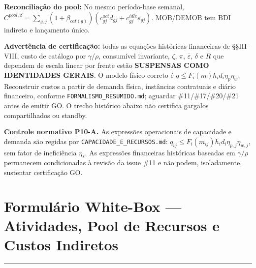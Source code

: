 \documentclass[
  10pt,
]{article}
\author{}
\date{}
\begin{document}
\noindent\textbf{Reconciliação do pool:}
No mesmo período-base semanal,
\(C^{pool,\beta}=\sum_{g,j}(1+\beta_{cat(g)})
(c_{gj}^{act}d_{gj}+c_{gj}^{idle}s_{gj})\).
MOB/DEMOB tem BDI indireto e lançamento único.

\noindent\textbf{Advertência de certificação:} todas as equações
históricas financeiras de §§III--VIII, custo de catálogo por
\(\gamma/\rho\), consumível invariante, \(\zeta\), \(\pi\),
\(\bar\varepsilon\), \(\delta\) e \(R\) que dependem de escala
linear por frente estão \textbf{SUSPENSAS COMO IDENTIDADES GERAIS}.
O modelo físico correto é \(q\le F_i(m)h_id_i\eta_p\eta_w\).
Reconstruir custos a partir de demanda física, instâncias
contratuais e diário financeiro, conforme
\texttt{FORMALISMO\_RESUMIDO.md}; aguardar \#11/\#17/\#20/\#21
antes de emitir GO. O trecho histórico abaixo não
certifica gargalos compartilhados ou standby.

\noindent\textbf{Controle normativo P10-A.}
As expressões operacionais de capacidade e demanda são regidas por
\texttt{CAPACIDADE\_E\_RECURSOS.md}: \(q_{ij}\le
F_i(m_{ij})h_id_i\eta_{p,j}\eta_{w,j}\), sem fator de ineficiência
\(\eta_s\). As expressões financeiras históricas baseadas em
\(\gamma/\rho\) permanecem condicionadas à revisão da issue \#11
e não podem, isoladamente, sustentar certificação GO.






{
\hypersetup{linkcolor=}
\setcounter{tocdepth}{4}
\tableofcontents
}
\hypertarget{formuluxe1rio-white-box-atividades-pool-de-recursos-e-custos-indiretos}{%
\section{Formulário White-Box --- Atividades, Pool de Recursos e Custos
Indiretos}\label{formuluxe1rio-white-box-atividades-pool-de-recursos-e-custos-indiretos}}

\begin{center}\rule{0.5\linewidth}{0.5pt}\end{center}
\end{document}
